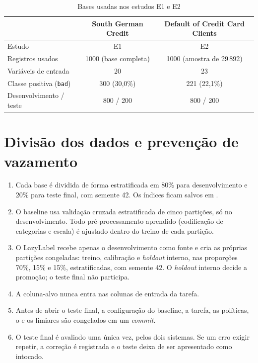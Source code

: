 \begin{table}[htb]
  \centering
  \caption{Bases usadas nos estudos E1 e E2}
  \label{tab:bases}
  \begin{tabular}{lcc}
    \toprule
    & South German Credit & Default of Credit Card Clients \\
    \midrule
    Estudo & E1 & E2 \\
    Registros usados & 1000 (base completa) & 1000 (amostra de 29\,892) \\
    Variáveis de entrada & 20 & 23 \\
    Classe positiva (\texttt{bad}) & 300 (30,0\%) & 221 (22,1\%) \\
    Desenvolvimento / teste & 800 / 200 & 800 / 200 \\
    \bottomrule
  \end{tabular}
\end{table}

\section{Divisão dos dados e prevenção de vazamento}
\label{sec:divisao}

\begin{enumerate}
  \item Cada base é dividida de forma estratificada em 80\% para desenvolvimento e 20\% para teste final, com semente 42. Os índices ficam salvos em .
  \item O baseline usa validação cruzada estratificada de cinco partições, só no desenvolvimento. Todo pré-processamento aprendido (codificação de categorias e escala) é ajustado dentro do treino de cada partição.
  \item O LazyLabel recebe apenas o desenvolvimento como fonte e cria as próprias partições congeladas: treino, calibração e \emph{holdout} interno, nas proporções 70\%, 15\% e 15\%, estratificadas, com semente 42. O \emph{holdout} interno decide a promoção; o teste final não participa.
  \item A coluna-alvo nunca entra nas colunas de entrada da tarefa.
  \item Antes de abrir o teste final, a configuração do baseline, a tarefa, as políticas, o  e os limiares são congelados em um \emph{commit}.
  \item O teste final é avaliado uma única vez, pelos dois sistemas. Se um erro exigir repetir, a correção é registrada e o teste deixa de ser apresentado como intocado.
\end{enumerate}

